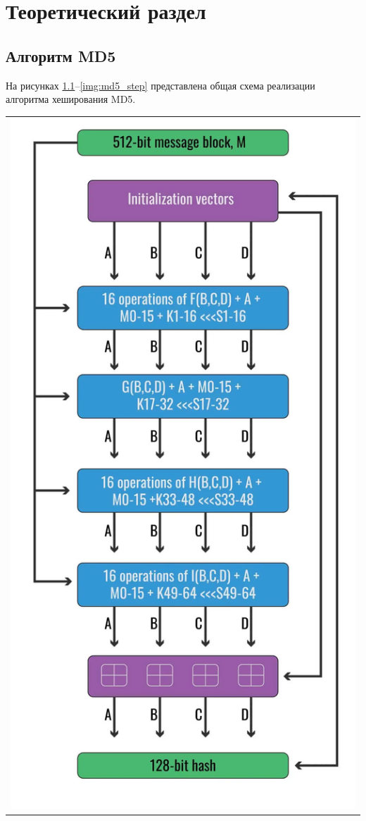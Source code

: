 \chapter{Теоретический раздел}

\section{Алгоритм MD5}

На рисунках \ref{img:md5_base}--\ref{img:md5_step} представлена общая схема реализации алгоритма хеширования MD5.

\begin{table}[H]
	\centering
	\begin{tabular}{p{1\linewidth}}
		\centering
		\includegraphics[width=0.45\linewidth]{assets/md5_base.png}
		\captionof{figure}{Общая схема реализации алгоритма хеширования MD5}
		\label{img:md5_base}
	\end{tabular}
\end{table}

\newpage

